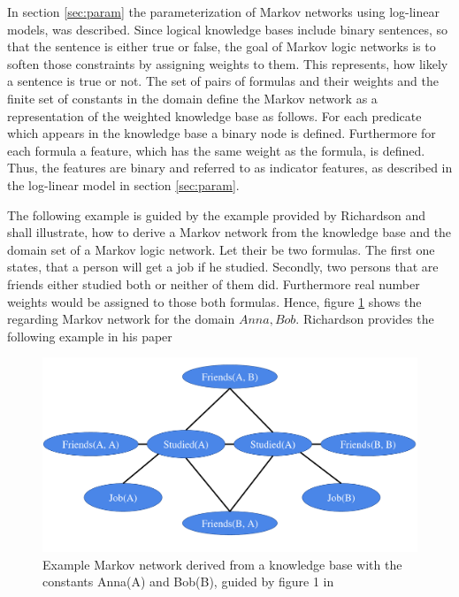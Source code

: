 In section \ref{sec:param} the parameterization of Markov networks using log-linear models, was described. Since logical knowledge bases include binary sentences, so that the sentence is either true or false, the goal of Markov logic networks is to soften those constraints by assigning weights to them. This represents, how likely a sentence is true or not. The set of pairs of formulas and their weights and the finite set of constants in the domain define the Markov network as a representation of the weighted knowledge base as follows. For each predicate which appears in the knowledge base a binary node is defined. Furthermore for each formula a feature, which has the same weight as the formula, is defined. Thus, the features are binary and referred to as indicator features, as described in the log-linear model in section \ref{sec:param}.

The following example is guided by the example provided by Richardson \cite{richardson2006markov} and shall illustrate, how to derive a Markov network from the knowledge base and the domain set of a Markov logic network. Let their be two formulas. The first one states, that a person will get a job if he studied. Secondly, two persons that are friends either studied both or neither of them did. Furthermore real number weights would be assigned to those both formulas. Hence, figure \ref{fig:mln} shows the regarding Markov network for the domain ${Anna,Bob}$.
Richardson provides the following example in his paper \cite{richardson2006markov}

\begin{figure}[htpb]
  \centering
  	\includegraphics[scale=0.4]{img/mln.pdf} 
  \caption{Example Markov network derived from a knowledge base with the constants Anna(A) and Bob(B), guided by figure 1 in \cite{richardson2006markov}}
  \label{fig:mln}
\end{figure}

